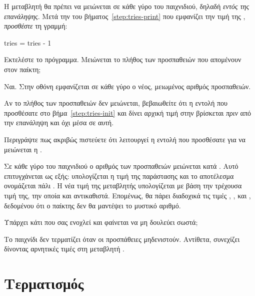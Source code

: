 \documentclass[a4paper,11pt,oneside]{book}
\begin{document}
\begin{step}
Η μεταβλητή  θα πρέπει να μειώνεται σε κάθε γύρο του παιχνιδιού, δηλαδή \emph{εντός της επανάληψης}. Μετά την  του βήματος~\ref{step:tries-print} που εμφανίζει την τιμή της , \emph{προσθέστε} τη γραμμή:

\begin{pynew}
    tries = tries - 1
\end{pynew}

Εκτελέστε το πρόγραμμα. Μειώνεται το πλήθος των προσπαθειών που απομένουν στον παίκτη;

\begin{answer}
	Ναι. Στην οθόνη εμφανίζεται σε κάθε γύρο ο νέος, μειωμένος αριθμός προσπαθειών.
\end{answer}

\marginnote[14pt]{\iconcaution}
Αν το πλήθος των προσπαθειών δεν μειώνεται, βεβαιωθείτε ότι η εντολή που προσθέσατε στο βήμα~\ref{step:tries-init} και δίνει αρχική τιμή στην  βρίσκεται \emph{πριν} από την επανάληψη και όχι μέσα σε αυτή.

Περιγράψτε πως ακριβώς πιστεύετε ότι λειτουργεί η εντολή που προσθέσατε για να μειώνεται η .

\begin{answer}
	Σε κάθε γύρο του παιχνιδιού ο αριθμός των προσπαθειών μειώνεται κατά . Αυτό επιτυγχάνεται ως εξής: υπολογίζεται η τιμή της παράστασης  και το αποτέλεσμα ονομάζεται πάλι . Η νέα τιμή της μεταβλητής  υπολογίζεται με βάση την τρέχουσα τιμή της, την οποία και αντικαθιστά. Επομένως, θα πάρει διαδοχικά τις τιμές , ,  και , δεδομένου ότι ο παίκτης δεν θα μαντέψει το μυστικό αριθμό.
\end{answer}

Υπάρχει κάτι που σας ενοχλεί και φαίνεται να μη δουλεύει σωστά;

\begin{answer}
	Το παιχνίδι δεν τερματίζει όταν οι προσπάθειες μηδενιστούν. Αντίθετα, συνεχίζει δίνοντας αρνητικές τιμές στη μεταβλητή .
\end{answer}
\end{step}
 
\section{Τερματισμός}
\end{document}
